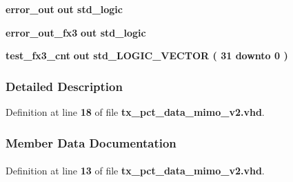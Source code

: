 \begin{DoxyCompactItemize}
\item 
{\bf error\+\_\+out}  {\bfseries {\bfseries \textcolor{keywordflow}{out}\textcolor{vhdlchar}{ }}} {\bfseries \textcolor{comment}{std\+\_\+logic}\textcolor{vhdlchar}{ }} 
\item 
{\bf error\+\_\+out\+\_\+fx3}  {\bfseries {\bfseries \textcolor{keywordflow}{out}\textcolor{vhdlchar}{ }}} {\bfseries \textcolor{comment}{std\+\_\+logic}\textcolor{vhdlchar}{ }} 
\item 
{\bf test\+\_\+fx3\+\_\+cnt}  {\bfseries {\bfseries \textcolor{keywordflow}{out}\textcolor{vhdlchar}{ }}} {\bfseries \textcolor{comment}{std\+\_\+\+L\+O\+G\+I\+C\+\_\+\+V\+E\+C\+T\+OR}\textcolor{vhdlchar}{ }\textcolor{vhdlchar}{(}\textcolor{vhdlchar}{ }\textcolor{vhdlchar}{ } \textcolor{vhdldigit}{31} \textcolor{vhdlchar}{ }\textcolor{keywordflow}{downto}\textcolor{vhdlchar}{ }\textcolor{vhdlchar}{ } \textcolor{vhdldigit}{0} \textcolor{vhdlchar}{ }\textcolor{vhdlchar}{)}\textcolor{vhdlchar}{ }} 
\end{DoxyCompactItemize}


\subsubsection{Detailed Description}


Definition at line {\bf 18} of file {\bf tx\+\_\+pct\+\_\+data\+\_\+mimo\+\_\+v2.\+vhd}.



\subsubsection{Member Data Documentation}
\paragraph[{ all }]{\hspace{0.3cm}{\ttfamily [Package]}}\label{classtx__pct__data__mimo__v2_a470a86ce8776f637b0483eabf2d92ad2}


Definition at line {\bf 13} of file {\bf tx\+\_\+pct\+\_\+data\+\_\+mimo\+\_\+v2.\+vhd}.


